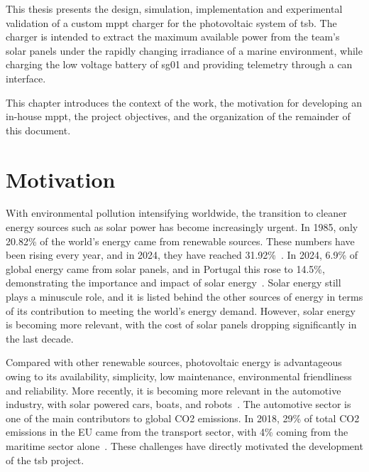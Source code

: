 \label{chap:introduction}

This thesis presents the design, simulation, implementation and experimental
validation of a custom \ac{mppt} charger for the photovoltaic system of
\ac{tsb}. The charger is intended to extract the maximum available power from
the team's solar panels under the rapidly changing irradiance of a marine
environment, while charging the low voltage battery of \ac{sg01} and providing
telemetry through a \ac{can} interface.

This chapter introduces the context of the work, the motivation for developing
an in-house \ac{mppt}, the project objectives, and the organization of the
remainder of this document.

\section{Motivation}
\label{sec:introduction:motivation}

With environmental pollution intensifying worldwide, the transition to cleaner energy sources such as solar power has become increasingly urgent.
In 1985, only 20.82\% of the world's energy came from renewable sources. These numbers have been rising every year, and in 2024, they have reached 31.92\%~\cite{ourworldindata_electricity_mix_2025}. In 2024, 6.9\% of global energy came from solar panels, and in Portugal this rose to 14.5\%, demonstrating the importance and impact of solar energy~\cite{ourworldindata_electricity_mix_2025}. Solar energy still plays a minuscule role, and it is listed behind the other sources of energy in terms of its contribution to meeting the world's energy demand. However, solar energy is becoming more relevant, with the cost of solar panels dropping significantly in the last decade. 

Compared with other renewable sources, photovoltaic energy is advantageous owing to its availability, simplicity, low maintenance, environmental friendliness and reliability.
More recently, it is becoming more relevant in the automotive industry, with solar powered cars, boats, and robots~\cite{shahira2022_electrical_design_solar_boat}. The automotive sector is one of the main contributors to global CO2 emissions. In 2018, 29\% of total CO2 emissions in the EU came from the transport sector, with 4\% coming from the maritime sector alone~\cite{icct_transport_eu_carbon_budget}.
These challenges have directly motivated the development of the \ac{tsb} project.

